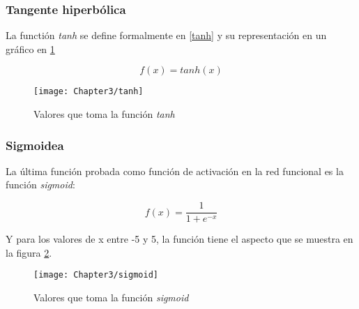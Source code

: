 \subsubsection{Tangente hiperbólica}

La functión \textit{tanh} se define formalmente en \ref{tanh} y su representación en un gráfico en \ref{fig:tanh}

\begin{equation}
f(x) = tanh(x)
\label{tanh}
\end{equation}

\begin{figure}[ht]
  \centering
    \texttt{[image: Chapter3/tanh]}
  \caption{Valores que toma la función \textit{tanh}}
\label{fig:tanh}
\end{figure}


\subsubsection{Sigmoidea}

La última función probada como función de activación en la red funcional es la función \textit{sigmoid}:

\begin{equation}
f(x)=\frac{1}{1+{e}^{-x}}
\end{equation}

Y para los valores de x entre -5 y 5, la función tiene el aspecto que se muestra en la figura \ref{fig:sigmoid}.


\begin{figure}[ht]
  \centering
    \texttt{[image: Chapter3/sigmoid]}
  \caption{Valores que toma la función \textit{sigmoid}}
\label{fig:sigmoid}
\end{figure}
